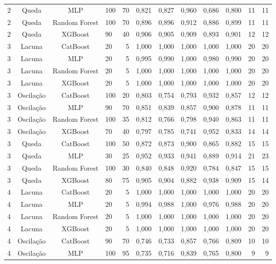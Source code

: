 \begin{longtable}{ccclrrrrrrrr}
2 & Queda & MLP & 100 & 70 & 0,821 & 0,827 & 0,960 & 0,686 & 0,800 & 11 & 11 \\
2 & Queda & Random Forest & 100 & 70 & 0,896 & 0,896 & 0,912 & 0,886 & 0,899 & 11 & 11 \\
2 & Queda & XGBoost & 90 & 40 & 0,906 & 0,905 & 0,909 & 0,893 & 0,901 & 12 & 12 \\
3 & Lacuna & CatBoost & 20 & 5 & 1,000 & 1,000 & 1,000 & 1,000 & 1,000 & 20 & 20 \\
3 & Lacuna & MLP & 20 & 5 & 0,995 & 0,990 & 1,000 & 0,980 & 0,990 & 20 & 20 \\
3 & Lacuna & Random Forest & 20 & 5 & 1,000 & 1,000 & 1,000 & 1,000 & 1,000 & 20 & 20 \\
3 & Lacuna & XGBoost & 20 & 5 & 1,000 & 1,000 & 1,000 & 1,000 & 1,000 & 20 & 20 \\
3 & Oscilação & CatBoost & 100 & 20 & 0,803 & 0,754 & 0,793 & 0,932 & 0,857 & 12 & 12 \\
3 & Oscilação & MLP & 90 & 70 & 0,851 & 0,839 & 0,857 & 0,900 & 0,878 & 11 & 11 \\
3 & Oscilação & Random Forest & 100 & 35 & 0,812 & 0,766 & 0,798 & 0,940 & 0,863 & 11 & 11 \\
3 & Oscilação & XGBoost & 70 & 40 & 0,797 & 0,785 & 0,741 & 0,952 & 0,833 & 14 & 14 \\
3 & Queda & CatBoost & 100 & 50 & 0,872 & 0,873 & 0,900 & 0,865 & 0,882 & 15 & 15 \\
3 & Queda & MLP & 30 & 25 & 0,952 & 0,933 & 0,941 & 0,889 & 0,914 & 21 & 23 \\
3 & Queda & Random Forest & 100 & 30 & 0,840 & 0,848 & 0,920 & 0,784 & 0,847 & 15 & 15 \\
3 & Queda & XGBoost & 80 & 75 & 0,905 & 0,904 & 0,882 & 0,938 & 0,909 & 15 & 14 \\
4 & Lacuna & CatBoost & 20 & 5 & 1,000 & 1,000 & 1,000 & 1,000 & 1,000 & 20 & 20 \\
4 & Lacuna & MLP & 20 & 5 & 0,994 & 0,988 & 1,000 & 0,976 & 0,988 & 20 & 20 \\
4 & Lacuna & Random Forest & 20 & 5 & 1,000 & 1,000 & 1,000 & 1,000 & 1,000 & 20 & 20 \\
4 & Lacuna & XGBoost & 20 & 5 & 1,000 & 1,000 & 1,000 & 1,000 & 1,000 & 20 & 20 \\
4 & Oscilação & CatBoost & 90 & 70 & 0,746 & 0,733 & 0,857 & 0,766 & 0,809 & 10 & 10 \\
4 & Oscilação & MLP & 100 & 95 & 0,735 & 0,716 & 0,839 & 0,765 & 0,800 & 9 & 9 \\

\end{longtable}
